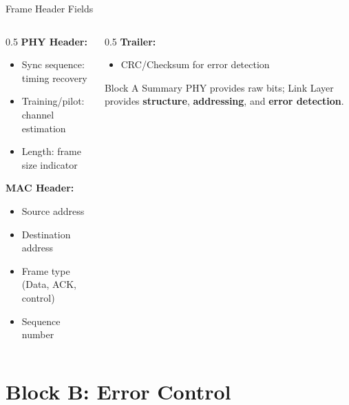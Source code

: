 \documentclass[aspectratio=169,11pt]{beamer}
\begin{document}
\begin{frame}{Frame Header Fields}
    \begin{columns}[T]
        \begin{column}{0.5\textwidth}
            \textbf{PHY Header:}
            \begin{itemize}
                \item Sync sequence: timing recovery
                \item Training/pilot: channel estimation
                \item Length: frame size indicator
            \end{itemize}
            
            \textbf{MAC Header:}
            \begin{itemize}
                \item Source address
                \item Destination address
                \item Frame type (Data, ACK, control)
                \item Sequence number
            \end{itemize}
        \end{column}
        \begin{column}{0.5\textwidth}
            \textbf{Trailer:}
            \begin{itemize}
                \item CRC/Checksum for error detection
            \end{itemize}
            
            \vspace{0.3cm}
            \begin{block}{Block A Summary}
                PHY provides raw bits; Link Layer provides \textbf{structure}, \textbf{addressing}, and \textbf{error detection}.
            \end{block}
        \end{column}
    \end{columns}
\end{frame}

\section{Block B: Error Control}
\end{document}
